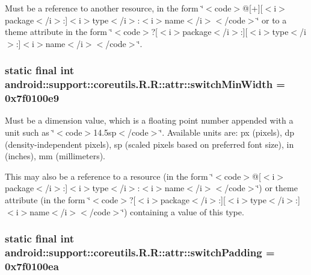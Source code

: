 Must be a reference to another resource, in the form \char`\"{}$<$code$>$@\mbox{[}+\mbox{]}\mbox{[}$<$i$>$package$<$/i$>$:\mbox{]}$<$i$>$type$<$/i$>$:$<$i$>$name$<$/i$>$$<$/code$>$\char`\"{} or to a theme attribute in the form \char`\"{}$<$code$>$?\mbox{[}$<$i$>$package$<$/i$>$:\mbox{]}\mbox{[}$<$i$>$type$<$/i$>$:\mbox{]}$<$i$>$name$<$/i$>$$<$/code$>$\char`\"{}. \hypertarget{classandroid_1_1support_1_1coreutils_1_1_r_1_1attr_abf7bae3a8dc5ca218cebc18581b40d0}{
\subsubsection[{switchMinWidth}]{\setlength{\rightskip}{0pt plus 5cm}static final int android::support::coreutils.R.R::attr::switchMinWidth = 0x7f0100e9}}
\label{classandroid_1_1support_1_1coreutils_1_1_r_1_1attr_abf7bae3a8dc5ca218cebc18581b40d0}


Must be a dimension value, which is a floating point number appended with a unit such as \char`\"{}$<$code$>$14.5sp$<$/code$>$\char`\"{}. Available units are: px (pixels), dp (density-independent pixels), sp (scaled pixels based on preferred font size), in (inches), mm (millimeters). 

This may also be a reference to a resource (in the form \char`\"{}$<$code$>$@\mbox{[}$<$i$>$package$<$/i$>$:\mbox{]}$<$i$>$type$<$/i$>$:$<$i$>$name$<$/i$>$$<$/code$>$\char`\"{}) or theme attribute (in the form \char`\"{}$<$code$>$?\mbox{[}$<$i$>$package$<$/i$>$:\mbox{]}\mbox{[}$<$i$>$type$<$/i$>$:\mbox{]}$<$i$>$name$<$/i$>$$<$/code$>$\char`\"{}) containing a value of this type. \hypertarget{classandroid_1_1support_1_1coreutils_1_1_r_1_1attr_9ab4db579fd2012ecf379ea022ac487a}{
\subsubsection[{switchPadding}]{\setlength{\rightskip}{0pt plus 5cm}static final int android::support::coreutils.R.R::attr::switchPadding = 0x7f0100ea}}
\label{classandroid_1_1support_1_1coreutils_1_1_r_1_1attr_9ab4db579fd2012ecf379ea022ac487a}



